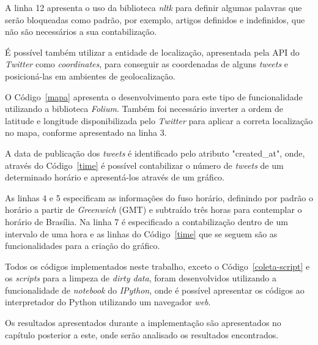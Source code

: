 A linha 12 apresenta o uso da biblioteca \textit{nltk} para definir algumas palavras que serão bloqueadas como padrão, por exemplo, artigos definidos e indefinidos, que não são necessários a sua contabilização.



É possível também utilizar a entidade de localização, apresentada pela API do \textit{Twitter} como \textit{coordinates}, para conseguir as coordenadas de alguns \textit{tweets} e posicioná-las em ambientes de geolocalização.

O Código~\ref{mapa} apresenta o desenvolvimento para este tipo de funcionalidade utilizando a biblioteca \textit{Folium}. Também foi necessário inverter a ordem de latitude e longitude disponibilizada pelo \textit{Twitter} para aplicar a correta localização no mapa, conforme apresentado na linha 3.



A data de publicação dos \textit{tweets} é identificado pelo atributo "created\_at", onde, através do Código~\ref{time} é possível contabilizar o número de \textit{tweets} de um determinado horário e apresentá-los através de um gráfico.

As linhas 4 e 5 especificam as informações do fuso horário, definindo por padrão o horário a partir de \textit{Greenwich} (GMT) e subtraído três horas para contemplar o horário de Brasília. Na linha 7 é especificado a contabilização dentro de um intervalo de uma hora e as linhas do Código~\ref{time} que se seguem são as funcionalidades para a criação do gráfico.



Todos os códigos implementados neste trabalho, exceto o Código~\ref{coleta-script} e os \textit{scripts} para a limpeza de \textit{dirty data}, foram desenvolvidos utilizando a funcionalidade de \textit{notebook} do \textit{IPython}, onde é possível apresentar os códigos ao interpretador do Python utilizando um navegador \textit{web}.

Os resultados apresentados durante a implementação são apresentados no capítulo posterior a este, onde serão analisado os resultados encontrados.




























